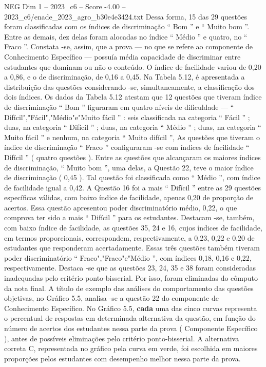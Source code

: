 \begin{textsample}{NEG Dim 1 – 2023\_c6 – Score -4.00 – 2023\_c6/enade\_2023\_agro\_b30e4e3424.txt}
Dessa forma, 15 das 29 questões foram classificadas com os índices de discriminação “ Bom ” e “ Muito bom ”.
Entre as demais, dez delas foram alocadas no índice “ Médio ” e quatro, no “ Fraco ”.
Constata -se, assim, que a prova — no que se refere ao componente de Conhecimento Específico — possuía média capacidade de discriminar entre estudantes que dominam ou não o conteúdo.
O índice de facilidade variou de 0,20 a 0,86, e o de discriminação, de 0,16 a 0,45.
Na Tabela 5.12, é apresentada a distribuição das questões considerando -se, simultaneamente, a classificação dos dois índices.
Os dados da Tabela 5.12 atestam que 12 questões que tiveram índice de discriminação “ Bom ” figuraram em quatro níveis de dificuldade — “ Difícil","Fácil","Médio"e"Muito fácil ” : seis classificada na categoria “ Fácil ” ; duas, na categoria “ Difícil ” ; duas, na categoria “ Médio ” ; duas, na categoria “ Muito fácil ” e nenhum, na categoria “ Muito difícil ”, As questões que tiveram o índice de discriminação “ Fraco ” configuraram -se com índices de facilidade “ Difícil ” ( quatro questões ).
Entre as questões que alcançaram os maiores índices de discriminação, “ Muito bom ”, uma delas, a Questão 22, teve o maior índice de discriminação ( 0,45 ).
Tal questão foi classificada como “ Médio ”, com índice de facilidade igual a 0,42.
A Questão 16 foi a mais “ Difícil ” entre as 29 questões específicas válidas, com baixo índice de facilidade, apenas 0,20 de proporção de acertos.
Essa questão apresentou poder discriminatório médio, 0,22, o que comprova ter sido a mais “ Difícil ” para os estudantes.
Destacam -se, também, com baixo índice de facilidade, as questões 35, 24 e 16, cujos índices de facilidade, em termos proporcionais, correspondem, respectivamente, a 0,23, 0,22 e 0,20 de estudantes que responderam acertadamente.
Essas três questões também tiveram poder discriminatório “ Fraco","Fraco"e"Médio ”, com índices 0,18, 0,16 e 0,22, respectivamente.
Destaca -se que as questões 23, 24, 35 e 38 foram consideradas inadequadas pelo critério ponto-bisserial.
Por isso, foram eliminadas do cômputo da nota final.
A título de exemplo das análises do comportamento das questões objetivas, no Gráfico 5.5, analisa -se a questão 22 do componente de Conhecimento Específico.
No Gráfico 5.5, \textbf{cada} uma das cinco curvas representa o percentual de respostas em determinada alternativa da questão, em função do número de acertos dos estudantes nessa parte da prova ( Componente Específico ), antes de possíveis eliminações pelo critério ponto-bisserial.
A alternativa correta C, representada no gráfico pela curva em verde, foi escolhida em maiores proporções pelos estudantes com desempenho melhor nessa parte da prova.

\end{textsample}
